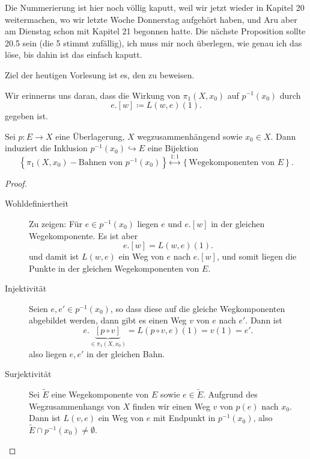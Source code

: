 
\begin{warning}
    Die Nummerierung ist hier noch völlig kaputt, weil wir jetzt wieder in Kapitel 20 weitermachen, wo wir letzte Woche Donnerstag aufgehört haben, und Aru aber am Dienstag schon mit Kapitel 21 begonnen hatte. Die nächste Proposition sollte 20.5 sein (die 5 stimmt zufällig), ich muss mir noch überlegen, wie genau ich das löse, bis dahin ist das einfach kaputt.
\end{warning}


Ziel der heutigen Vorlesung ist es, den \nameref{} zu beweisen.

Wir erinnerns uns daran, dass die Wirkung von $\pi_1(X,x_0)$ auf $p^{-1} (x_0)$ durch
\[
    e.[w] \coloneqq  L(w,e)(1)
.\] 
gegeben ist.
\begin{proposition}
    Sei $p\colon E\to X$ eine Überlagerung,  $X$ wegzusammenhängend sowie  $x_0\in X$. Dann induziert die Inklusion $p^{-1} (x_0) \hookrightarrow E$ eine Bijektion
    \[
        \left \{\pi_1(X,x_0) - \text{Bahnen von } p^{-1} (x_0) \right\}  \stackrel{1:1}{\longleftrightarrow} \left \{\text{Wegekomponenten von } E\right\} 
    .\] 
\end{proposition}

\begin{proof}
    \begin{description}
        \item[Wohldefiniertheit] Zu zeigen: Für $e\in p^{-1} (x_0)$ liegen $e$ und  $e.[w]$ in der gleichen Wegekomponente. Es ist aber
             \[
                 e.[w] = L(w,e)(1)
            .\] 
            und damit ist $L(w,e)$ ein Weg von  $e$ nach  $e.[w]$, und somit liegen die Punkte in der gleichen Wegekomponenten von  $E$.
        \item[Injektivität] Seien  $e,e'\in p^{-1} (x_0)$, so dass diese auf die gleiche Wegkomponenten abgebildet werden, dann gibt es einen Weg $v$ von  $e$ nach  $e'$. Dann ist
             \[
                 e.\underbrace{[p \circ  v]}_{\in \pi_1(X,x_0)}  = L(p \circ  v, e)(1) = v(1) = e'
            .\] 
            also liegen $e,e'$ in der gleichen Bahn.
        \item[Surjektivität] Sei  $\tilde{E}$ eine Wegekomponente von $E$ sowie  $e\in \tilde{E}$. Aufgrund des Wegzusammenhangs von $X$ finden wir einen Weg  $v$ von  $p(e)$ nach  $x_0$. Dann ist $L(v,e)$ ein Weg von  $e$ mit Endpunkt in  $p^{-1} (x_0)$, also $\tilde{E} \cap  p^{-1} (x_0) \neq  \emptyset$.
    \end{description}
\end{proof}

